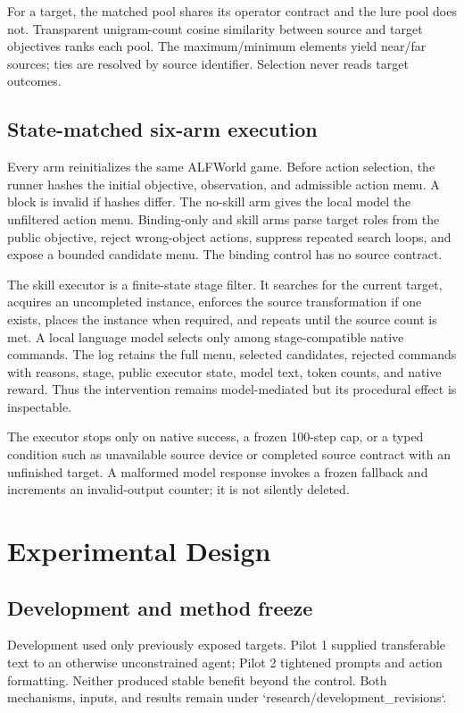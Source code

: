 \documentclass[10pt]{article}
\begin{document}
For a target, the matched pool shares its operator contract and the lure pool
does not. Transparent unigram-count cosine similarity between source and target
objectives ranks each pool. The maximum/minimum elements yield near/far sources;
ties are resolved by source identifier. Selection never reads target outcomes.

\subsection{State-matched six-arm execution}
Every arm reinitializes the same ALFWorld game. Before action selection, the
runner hashes the initial objective, observation, and admissible action menu.
A block is invalid if hashes differ. The no-skill arm gives the local model the
unfiltered action menu. Binding-only and skill arms parse target roles from the
public objective, reject wrong-object actions, suppress repeated search loops,
and expose a bounded candidate menu. The binding control has no source contract.

The skill executor is a finite-state stage filter. It searches for the current
target, acquires an uncompleted instance, enforces the source transformation if
one exists, places the instance when required, and repeats until the source
count is met. A local language model selects only among stage-compatible native
commands. The log retains the full menu, selected candidates, rejected commands
with reasons, stage, public executor state, model text, token counts, and native
reward. Thus the intervention remains model-mediated but its procedural effect
is inspectable.

The executor stops only on native success, a frozen 100-step cap, or a typed
condition such as unavailable source device or completed source contract with
an unfinished target. A malformed model response invokes a frozen fallback and
increments an invalid-output counter; it is not silently deleted.

\section{Experimental Design}
\subsection{Development and method freeze}
Development used only previously exposed targets. Pilot 1 supplied transferable
text to an otherwise unconstrained agent; Pilot 2 tightened prompts and action
formatting. Neither produced stable benefit beyond the control. Both mechanisms,
inputs, and results remain under `research/development\_revisions`.
\end{document}
